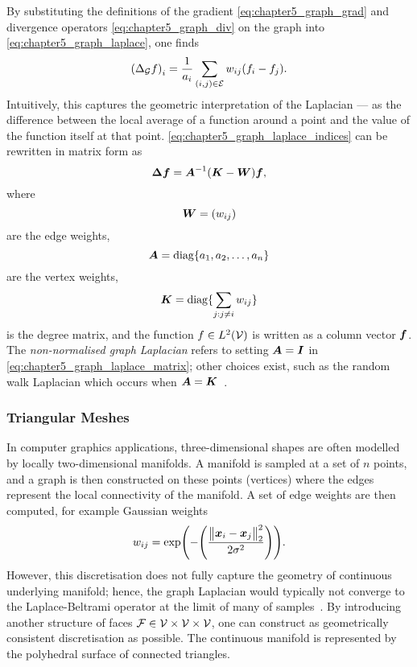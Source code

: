 By substituting the definitions of the gradient \cref{eq:chapter5_graph_grad} and divergence operators \cref{eq:chapter5_graph_div} on the graph into \cref{eq:chapter5_graph_laplace}, one finds
%
\begin{equation}\label{eq:chapter5_graph_laplace_indices}
	{(\Delta_{\mathcal{G}} f)}_{i}
	= \frac{1}{a_{i}} \sum\limits_{(i,j) \in \mathcal{E}} w_{i j} (f_{i} - f_{j}).
\end{equation}
%
Intuitively, this captures the geometric interpretation of the Laplacian --- as the difference between the local average of a function around a point and the value of the function itself at that point.
\cref{eq:chapter5_graph_laplace_indices} can be rewritten in matrix form as
%
\begin{equation}\label{eq:chapter5_graph_laplace_matrix}
	\vb*{\Delta} \vb*{f}
	= \vb*{A}^{-1} (\vb*{K} - \vb*{W}) \vb*{f},
\end{equation}
%
where
%
\begin{equation}
	\vb*{W}
	= (w_{i j})
\end{equation}
%
are the edge weights,
%
\begin{equation}
	\vb*{A}
	= \text{diag}\{a_{1},a_{2},\ldots,a_{n}\}
\end{equation}
%
are the vertex weights,
%
\begin{equation}
	\vb*{K}
	= \text{diag}\{\sum\limits_{j: j \neq i} w_{i j}\}
\end{equation}
%
is the degree matrix, and the function \(f \in L^{2}(\mathcal{V})\) is written as a column vector \(\vb*{f}\).
The \emph{non-normalised graph Laplacian} refers to setting \(\vb*{A} = \vb*{I}\) in \cref{eq:chapter5_graph_laplace_matrix}; other choices exist, such as the random walk Laplacian which occurs when \(\vb*{A} = \vb*{K}\)~\cite{VonLuxburg2007}.

\subsubsection{Triangular Meshes}

In computer graphics applications, three-dimensional shapes are often modelled by locally two-dimensional manifolds.
A manifold is sampled at a set of \(n\) points, and a graph is then constructed on these points (vertices) where the edges represent the local connectivity of the manifold.
A set of edge weights are then computed, for example Gaussian weights
%
\begin{equation}
	w_{i j}
	= \exp(-\Bigg(\frac{{\big\lVert\vb*{x}_{i} - \vb*{x}_{j}\big\rVert}_{2}^{2}}{2\sigma^{2}}\Bigg)).
\end{equation}
%
However, this discretisation does not fully capture the geometry of continuous underlying manifold; hence, the graph Laplacian would typically not converge to the Laplace-Beltrami operator at the limit of many of samples~\cite{Wardetzky2007}.
By introducing another structure of faces \(\mathcal{F} \in \mathcal{V} \times \mathcal{V} \times \mathcal{V}{}\), one can construct as geometrically consistent discretisation as possible.
The continuous manifold is represented by the polyhedral surface of connected triangles.

